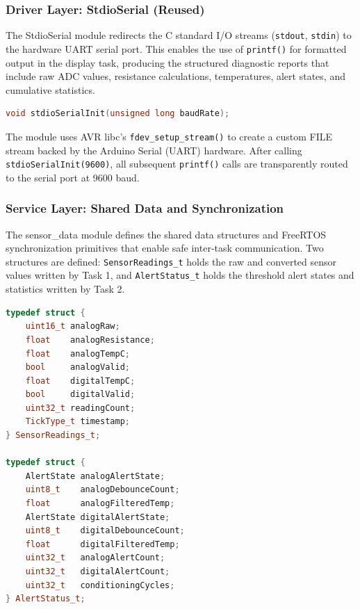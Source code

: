 \subsubsection{Driver Layer: StdioSerial (Reused)}

The StdioSerial module redirects the C standard I/O streams (\texttt{stdout}, \texttt{stdin}) to the hardware UART serial port. This enables the use of \texttt{printf()} for formatted output in the display task, producing the structured diagnostic reports that include raw ADC values, resistance calculations, temperatures, alert states, and cumulative statistics.

\begin{lstlisting}[language=C++, caption=StdioSerial interface (StdioSerial.h) --- reused from Lab 1.1, label=lst:stdio_serial_h]
void stdioSerialInit(unsigned long baudRate);
\end{lstlisting}

The module uses AVR libc's \texttt{fdev\_setup\_stream()} to create a custom FILE stream backed by the Arduino Serial (UART) hardware. After calling \texttt{stdioSerialInit(9600)}, all subsequent \texttt{printf()} calls are transparently routed to the serial port at 9600 baud.

\subsubsection{Service Layer: Shared Data and Synchronization}

The sensor\_data module defines the shared data structures and FreeRTOS synchronization primitives that enable safe inter-task communication. Two structures are defined: \texttt{SensorReadings\_t} holds the raw and converted sensor values written by Task 1, and \texttt{AlertStatus\_t} holds the threshold alert states and statistics written by Task 2.

\begin{lstlisting}[language=C++, caption=Shared data structures (sensor\_data.h --- excerpt), label=lst:sensor_data_h]
typedef struct {
    uint16_t analogRaw;
    float    analogResistance;
    float    analogTempC;
    bool     analogValid;
    float    digitalTempC;
    bool     digitalValid;
    uint32_t readingCount;
    TickType_t timestamp;
} SensorReadings_t;

typedef struct {
    AlertState analogAlertState;
    uint8_t    analogDebounceCount;
    float      analogFilteredTemp;
    AlertState digitalAlertState;
    uint8_t    digitalDebounceCount;
    float      digitalFilteredTemp;
    uint32_t   analogAlertCount;
    uint32_t   digitalAlertCount;
    uint32_t   conditioningCycles;
} AlertStatus_t;
\end{lstlisting}


